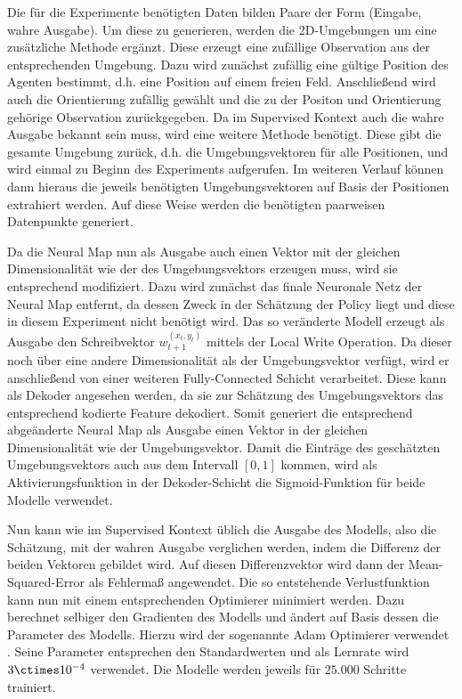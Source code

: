 Die für die Experimente benötigten Daten bilden Paare der Form (Eingabe, wahre Ausgabe). Um diese zu generieren, werden die 2D-Umgebungen um eine zusätzliche Methode ergänzt. Diese erzeugt eine zufällige Observation aus der entsprechenden Umgebung. Dazu wird zunächst zufällig eine gültige Position des Agenten bestimmt, d.h. eine Position auf einem freien Feld. Anschließend wird auch die Orientierung zufällig gewählt und die zu der Positon und Orientierung gehörige Observation zurückgegeben. Da im Supervised Kontext auch die wahre Ausgabe bekannt sein muss, wird eine weitere Methode benötigt. Diese gibt die gesamte Umgebung zurück, d.h. die Umgebungsvektoren für alle Positionen, und wird einmal zu Beginn des Experiments aufgerufen. Im weiteren Verlauf können dann hieraus die jeweils benötigten Umgebungsvektoren auf Basis der Positionen extrahiert werden. Auf diese Weise werden die benötigten paarweisen Datenpunkte generiert.

Da die Neural Map nun als Ausgabe auch einen Vektor mit der gleichen Dimensionalität wie der des Umgebungsvektors erzeugen muss, wird sie entsprechend modifiziert. Dazu wird zunächst das finale Neuronale Netz der Neural Map entfernt, da dessen Zweck in der Schätzung der Policy liegt und diese in diesem Experiment nicht benötigt wird. Das so veränderte Modell erzeugt als Ausgabe den Schreibvektor $w_{t+1}^{(x_t,y_t)}$ mittels der Local Write Operation. Da dieser noch über eine andere Dimensionalität als der Umgebungsvektor verfügt, wird er anschließend von einer weiteren Fully-Connected Schicht verarbeitet. Diese kann als Dekoder angesehen werden, da sie zur Schätzung des Umgebungsvektors das entsprechend kodierte Feature dekodiert. Somit generiert die entsprechend abgeänderte Neural Map als Ausgabe einen Vektor in der gleichen Dimensionalität wie der Umgebungsvektor. Damit die Einträge des geschätzten Umgebungsvektors auch aus dem Intervall $[0, 1]$ kommen, wird als Aktivierungsfunktion in der Dekoder-Schicht die Sigmoid-Funktion für beide Modelle verwendet.

Nun kann wie im Supervised Kontext üblich die Ausgabe des Modells, also die Schätzung, mit der wahren Ausgabe verglichen werden, indem die Differenz der beiden Vektoren gebildet wird. Auf diesen Differenzvektor wird dann der Mean-Squared-Error als Fehlermaß angewendet. Die so entstehende Verlustfunktion kann nun mit einem entsprechenden Optimierer minimiert werden. Dazu berechnet selbiger den Gradienten des Modells und ändert auf Basis dessen die Parameter des Modells. Hierzu wird der sogenannte Adam Optimierer verwendet \cite{Adam}. Seine Parameter entsprechen den Standardwerten und als Lernrate wird $3\ctimes10^{-4}$ verwendet. Die Modelle werden jeweils für $25.000$ Schritte trainiert.

